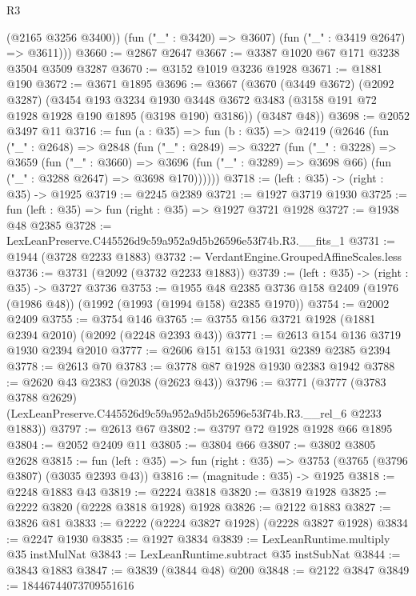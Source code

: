 \begin{lexlean}{R3}
\begin{coremodule}
          (@2165 @3256 @3400))
        (fun ("_" : @3420) => @3607)
        (fun ("_" : @3419 @2647) => @3611)))
@3660 := @2867 @2647
@3667 := @3387 @1020 @67 @171 @3238 @3504 @3509 @3287
@3670 := @3152 @1019 @3236 @1928
@3671 := @1881 @190
@3672 := @3671 @1895
@3696 := @3667
    (@3670
      (@3449 @3672)
      (@2092 @3287)
      (@3454
        @193
        @3234
        @1930
        @3448
        @3672
        @3483
        (@3158 @191 @72 @1928 @1928 @190 @1895 (@3198 @190) @3186))
      (@3487 @48))
@3698 := @2052 @3497 @11
@3716 := fun (a : @35) =>
  fun (b : @35) =>
  @2419
    (@2646
      (fun ("_" : @2648) =>
      @2848
        (fun ("_" : @2849) =>
        @3227
          (fun ("_" : @3228) =>
          @3659
            (fun ("_" : @3660) =>
            @3696 (fun ("_" : @3289) => @3698 @66) (fun ("_" : @3288 @2647) => @3698 @170))))))
@3718 := (left : @35) -> (right : @35) -> @1925
@3719 := @2245 @2389
@3721 := @1927 @3719 @1930
@3725 := fun (left : @35) => fun (right : @35) => @1927 @3721 @1928
@3727 := @1938 @48 @2385
@3728 := LexLeanPreserve.C445526d9c59a952a9d5b26596e53f74b.R3.__fits_1
@3731 := @1944 (@3728 @2233 @1883)
@3732 := VerdantEngine.GroupedAffineScales.less
@3736 := @3731 (@2092 (@3732 @2233 @1883))
@3739 := (left : @35) -> (right : @35) -> @3727 @3736
@3753 := @1955
    @48
    @2385
    @3736
    @158
    @2409
    (@1976 (@1986 @48))
    (@1992 (@1993 (@1994 @158) @2385 @1970))
@3754 := @2002 @2409
@3755 := @3754 @146
@3765 := @3755 @156 @3721 @1928 (@1881 @2394 @2010) (@2092 (@2248 @2393 @43))
@3771 := @2613 @154 @136 @3719 @1930 @2394 @2010
@3777 := @2606 @151 @153 @1931 @2389 @2385 @2394
@3778 := @2613 @70
@3783 := @3778 @87 @1928 @1930 @2383 @1942
@3788 := @2620 @43 @2383 (@2038 (@2623 @43))
@3796 := @3771
    (@3777
      (@3783 @3788 @2629)
      (LexLeanPreserve.C445526d9c59a952a9d5b26596e53f74b.R3.__rel_6 @2233 @1883))
@3797 := @2613 @67
@3802 := @3797 @72 @1928 @1928 @66 @1895
@3804 := @2052 @2409 @11
@3805 := @3804 @66
@3807 := @3802 @3805 @2628
@3815 := fun (left : @35) => fun (right : @35) => @3753 (@3765 (@3796 @3807) (@3035 @2393 @43))
@3816 := (magnitude : @35) -> @1925
@3818 := @2248 @1883 @43
@3819 := @2224 @3818
@3820 := @3819 @1928
@3825 := @2222 @3820 (@2228 @3818 @1928) @1928
@3826 := @2122 @1883
@3827 := @3826 @81
@3833 := @2222 (@2224 @3827 @1928) (@2228 @3827 @1928)
@3834 := @2247 @1930
@3835 := @1927 @3834
@3839 := LexLeanRuntime.multiply @35 instMulNat
@3843 := LexLeanRuntime.subtract @35 instSubNat
@3844 := @3843 @1883
@3847 := @3839 (@3844 @48) @200
@3848 := @2122 @3847
@3849 := 18446744073709551616

\end{coremodule}
\end{lexlean}
